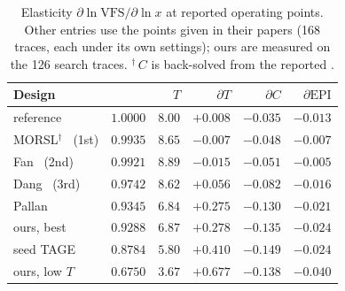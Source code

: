 \documentclass[conference]{IEEEtran}
\newcommand{\vfs}{\text{VFS}}
\newcommand{\epi}{\text{EPI}}
\begin{document}
\begin{table}[t]
\caption{Elasticity $\partial\ln\vfs{}/\partial\ln x$ at reported operating
points. Other entries use the points given in their papers (168 traces, each
under its own settings); ours are measured on the 126 search traces.
$^\dagger$\,$C$ is back-solved from the reported \vfs{}.}
\label{tab:elast}
\centering\footnotesize
\begin{tabular}{@{}lrrrrr@{}}
\toprule
Design & \vfs{} & $T$ & $\partial T$ & $\partial C$ & $\partial\epi{}$ \\
\midrule
reference & $1.0000$ & $8.00$ & $+0.008$ & $-0.035$ & $-0.013$ \\
\midrule
MORSL$^\dagger$~\cite{koizumi} (1st) & $0.9935$ & $8.65$ & $-0.007$ & $-0.048$ & $-0.007$ \\
Fan~\cite{fan} (2nd) & $0.9921$ & $8.89$ & $-0.015$ & $-0.051$ & $-0.005$ \\
Dang~\cite{dang} (3rd) & $0.9742$ & $8.62$ & $+0.056$ & $-0.082$ & $-0.016$ \\
\midrule
Pallan~\cite{pallan} & $0.9345$ & $6.84$ & $+0.275$ & $-0.130$ & $-0.021$ \\
ours, best & $0.9288$ & $6.87$ & $+0.278$ & $-0.135$ & $-0.024$ \\
seed TAGE & $0.8784$ & $5.80$ & $+0.410$ & $-0.149$ & $-0.024$ \\
ours, low $T$ & $0.6750$ & $3.67$ & $+0.677$ & $-0.138$ & $-0.040$ \\
\bottomrule
\end{tabular}
\end{table}
\end{document}
